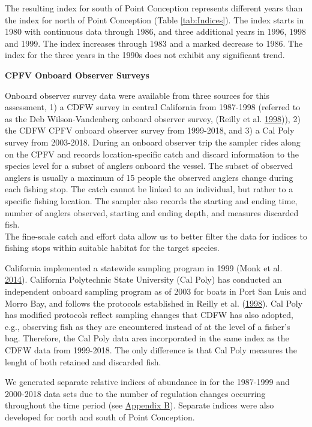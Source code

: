 \documentclass[12pt,]{article}
\begin{document}
The resulting index for south of Point Conception represents different
years than the index for north of Point Conception (Table
\ref{tab:Indices}). The index starts in 1980 with continuous data
through 1986, and three additional years in 1996, 1998 and 1999. The
index increases through 1983 and a marked decrease to 1986. The index
for the three years in the 1990s does not exhibit any significant trend.

\textbf{CPFV Onboard Observer Surveys}

Onboard observer survey data were available from three sources for this
assessment, 1) a CDFW survey in central California from 1987-1998
(referred to as the Deb Wilson-Vandenberg onboard observer survey,
(Reilly et al. \protect\hyperlink{ref-Reilly1998}{1998})), 2) the CDFW
CPFV onboard observer survey from 1999-2018, and 3) a Cal Poly survey
from 2003-2018. During an onboard observer trip the sampler rides along
on the CPFV and records location-specific catch and discard information
to the species level for a subset of anglers onboard the vessel. The
subset of observed anglers is usually a maximum of 15 people the
observed anglers change during each fishing stop. The catch cannot be
linked to an individual, but rather to a specific fishing location. The
sampler also records the starting and ending time, number of anglers
observed, starting and ending depth, and measures discarded fish.\\
The fine-scale catch and effort data allow us to better filter the data
for indices to fishing stops within suitable habitat for the target
species.

California implemented a statewide sampling program in 1999 (Monk et al.
\protect\hyperlink{ref-Monk2014}{2014}). California Polytechnic State
University (Cal Poly) has conducted an independent onboard sampling
program as of 2003 for boats in Port San Luis and Morro Bay, and follows
the protocols established in Reilly et al.
(\protect\hyperlink{ref-Reilly1998}{1998}). Cal Poly has modified
protocols reflect sampling changes that CDFW has also adopted, e.g.,
observing fish as they are encountered instead of at the level of a
fisher's bag. Therefore, the Cal Poly data area incorporated in the same
index as the CDFW data from 1999-2018. The only difference is that Cal
Poly measures the lenght of both retained and discarded fish.

We generated separate relative indices of abundance in for the 1987-1999
and 2000-2018 data sets due to the number of regulation changes
occurring throughout the time period (see
\protect\hyperlink{appendix-b.-californias-recreational-fishery-regulations}{Appendix
B}). Separate indices were also developed for north and south of Point
Conception.
\end{document}
